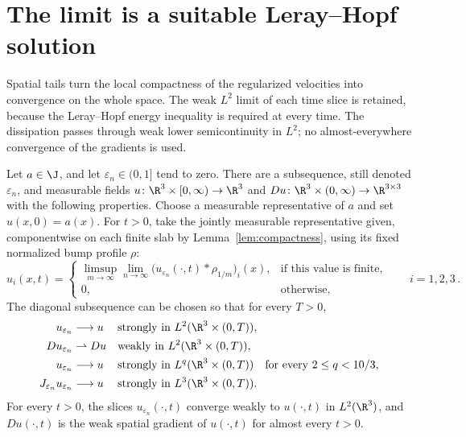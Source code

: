 \documentclass[11pt,reqno]{amsart}
\begin{document}
\section{The limit is a suitable Leray--Hopf solution}\label{sec:limit}

Spatial tails turn the local compactness of the regularized velocities into
convergence on the whole space. The weak $L^2$ limit of each time slice is
retained, because the Leray--Hopf energy inequality is required at every time.
The dissipation passes through weak lower semicontinuity in $L^2$; no
almost-everywhere convergence of the gradients is used.

\begin{proposition}\label{prop:leray-limit}
Let $a\in\J$, and let $\varepsilon_n\in(0,1]$ tend to zero. There are a
subsequence, still denoted $\varepsilon_n$, and measurable fields
$u\colon\R^3\times[0,\infty)\to\R^3$ and
$Du\colon\R^3\times(0,\infty)\to\R^{3\times3}$ with the following
properties. Choose a measurable representative of $a$ and set
$u(x,0)=a(x)$. For $t>0$, take the jointly measurable representative given,
componentwise on each finite slab by Lemma~\ref{lem:compactness}, using its
fixed normalized bump profile $\rho$:
\begin{equation}\label{eq:leray-limit-representative}
u_i(x,t)=
\begin{cases}
\displaystyle\limsup_{m\to\infty}\lim_{n\to\infty}
   \bigl(u_{\varepsilon_n}(\cdot,t)*\rho_{1/m}\bigr)_i(x),
   &\text{if this value is finite},\\
0,&\text{otherwise},
\end{cases}
\qquad i=1,2,3\,.
\end{equation}
The diagonal subsequence can be chosen so that for every $T>0$,
\begin{align}
 u_{\varepsilon_n}&\longrightarrow u
   &&\text{strongly in }L^2(\R^3\times(0,T)),\label{eq:leray-limit-L2}\\
 Du_{\varepsilon_n}&\rightharpoonup Du
   &&\text{weakly in }L^2(\R^3\times(0,T)),\label{eq:leray-limit-Du}\\
 u_{\varepsilon_n}&\longrightarrow u
   &&\text{strongly in }L^q(\R^3\times(0,T))
       \quad\text{for every }2\le q<10/3,\label{eq:leray-limit-Lq}\\
 J_{\varepsilon_n}u_{\varepsilon_n}&\longrightarrow u
   &&\text{strongly in }L^3(\R^3\times(0,T)).\label{eq:leray-limit-JL3}
\end{align}
For every $t>0$, the slices $u_{\varepsilon_n}(\cdot,t)$ converge weakly to
$u(\cdot,t)$ in $L^2(\R^3)$, and $Du(\cdot,t)$ is the weak spatial
gradient of $u(\cdot,t)$ for almost every $t>0$.
\end{proposition}
\end{document}
